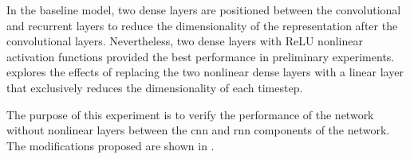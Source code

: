 
In the baseline model, two dense layers are positioned
between the convolutional and recurrent layers to reduce the
dimensionality of the representation after the convolutional
layers. Nevertheless, two dense layers with ReLU nonlinear
activation functions provided the best performance in
preliminary experiments. 
explores the effects of replacing the two nonlinear dense
layers with a linear layer that exclusively reduces the
dimensionality of each timestep.

The purpose of this experiment is to verify the performance
of the network without nonlinear layers between the
\gls{cnn} and \gls{rnn} components of the network. The
modifications proposed are shown in .

